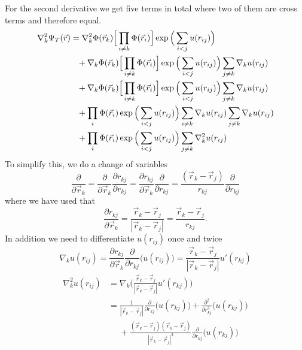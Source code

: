 \documentclass[norsk,a4paper,12pt]{article}
\begin{document}
For the second derivative we get five terms in total where two of them are cross terms and therefore equal. 
\begin{align}
\nabla_k^2\Psi_T(\vec{r})&=\nabla_k^2\Phi(\vec{r}_k)\Big[\prod_{i \neq k}\Phi(\vec{r}_i)\Big]\exp\Big(\sum_{i<j}u(r_{ij})\Big)\notag\\
&\phantom{=}+\nabla_k\Phi(\vec{r}_k)\Big[\prod_{i \neq k}\Phi(\vec{r}_i)\Big]\exp\Big(\sum_{i<j}u(r_{ij})\Big)\sum_{j\neq k}\nabla_ku(r_{ij})\notag\\
&\phantom{=}+\nabla_k\Phi(\vec{r}_k)\Big[\prod_{i \neq k}\Phi(\vec{r}_i)\Big]\exp\Big(\sum_{i<j}u(r_{ij})\Big)\sum_{j\neq k}\nabla_ku(r_{ij})\\
&\phantom{=}+\prod_i\Phi(\vec{r}_i)\exp\Big(\sum_{i<j}u(r_{ij})\Big)\sum_{i\neq k}\nabla_ku(r_{ij})\sum_{j\neq k}\nabla_ku(r_{ij})\notag\\
&\phantom{=}+\prod_i\Phi(\vec{r}_i)\exp\Big(\sum_{i<j}u(r_{ij})\Big)\sum_{j\neq k}\nabla_k^2u(r_{ij})\notag
\end{align}
To simplify this, we do a change of variables
\begin{equation}
\frac{\partial}{\partial \vec{r}_k}=\frac{\partial}{\partial \vec{r}_k}\frac{\partial r_{kj}}{\partial r_{kj}}=\frac{\partial r_{kj}}{\partial \vec{r}_k}\frac{\partial}{\partial r_{kj}}=\frac{(\vec{r}_k-\vec{r}_j)}{r_{kj}}\frac{\partial}{\partial r_{kj}}
\end{equation}
where we have used that
\begin{equation}
\frac{\partial r_{kj}}{\partial \vec{r}_k}=\frac{\vec{r}_k - \vec{r}_j}{|\vec{r}_k - \vec{r}_j|}=\frac{\vec{r}_k - \vec{r}_j}{r_{kj}}.
\end{equation}
In addition we need to differentiate $u(r_{ij})$ once and twice
\begin{equation}
\nabla_ku(r_{ij})=\frac{\partial r_{kj}}{\partial \vec{r}_k}\frac{\partial}{\partial r_{kj}}\big(u(r_{ij})\big)=\frac{\vec{r}_k - \vec{r}_j}{|\vec{r}_k - \vec{r}_j|}u'(r_{kj})
\end{equation}
\begin{align*}
\nabla_k^2u(r_{ij})&=\nabla_k\bigg(\frac{\vec{r}_k - \vec{r}_j}{|\vec{r}_k - \vec{r}_j|}u'(r_{kj})\bigg)\\
&=\frac{1}{|\vec{r}_k-\vec{r}_j|}\frac{\partial}{\partial r_{kj}}\big(u(r_{kj})\big)+\frac{\partial^2}{\partial r_{kj}^2}\big(u(r_{kj})\big)\\
&\phantom{=}+\frac{(\vec{r}_k-\vec{r}_j)(\vec{r}_k-\vec{r}_j)}{|\vec{r}_k-\vec{r}_j|^3}\frac{\partial}{\partial r_{kj}}\big(u(r_{kj})\big)
\end{align*}
\end{document}
